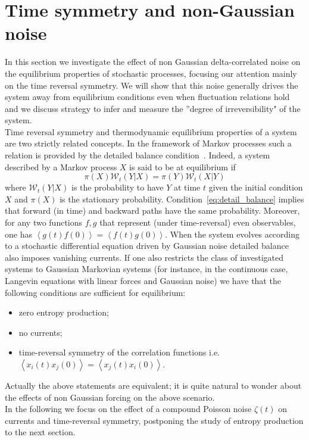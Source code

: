 \documentclass[12pt]{iopart}
\newcommand{\lx} {\left}
\newcommand{\rx} {\right}
\newcommand{\ave}[1] {\lx\langle #1 \rx\rangle}
\newcommand{\cW} {\mathcal{W}}
\begin{document}
\section{Time symmetry and non-Gaussian noise}
\label{sec:ts}
In this section we investigate the effect of non Gaussian delta-correlated noise on the equilibrium properties of stochastic processes, focusing our attention mainly on the time reversal symmetry. We will show that this noise generally drives the system away from equilibrium conditions even when fluctuation relations hold and we discuss strategy to infer and measure the  ”degree of irreversibility" of the system.\\
Time reversal symmetry and thermodynamic equilibrium properties of a system are two strictly related concepts. 
In the framework of Markov processes such a relation is provided by the detailed balance condition~\cite{G90}. Indeed, a system described by a Markov process $X$ is said to be at equilibrium if 
\begin{equation}
    \pi(X)\cW_t(Y|X)=\pi(Y){\cW}_t(X|Y)
\label{eq:detail_balance}
\end{equation}
where $\cW_t(Y|X)$ is the probability to have $Y$ at time $t$ given the initial condition $X$ and $\pi(X)$ is the stationary probability. Condition~\ref{eq:detail_balance} implies that forward (in time) and backward paths have the same probability. Moreover, for any two functions $f,g$ that represent  (under time-reversal) even observables, one has $\ave{g(t)f (0) }=\ave{f(t) g (0) }$. When the system evolves according to a stochastic differential equation driven by Gaussian noise detailed balance also imposes vanishing currents. If one also restricts the class of investigated systems to Gaussian Markovian systems (for instance, in the continuous case, Langevin equations with linear forces and Gaussian noise) we have that the following conditions are sufficient for equilibrium:
\begin{itemize}
  \item  zero entropy production;
  \item no currents;
  \item time-reversal symmetry  of the correlation functions  i.e. $\ave{x_i(t)x_j(0)}=\ave{x_j(t)x_i(0)}$.
\end{itemize}
Actually  the above statements  are  equivalent;
it is quite natural to wonder about the effects of  non Gaussian forcing on the above scenario. \\
In the following we focus on the effect of a compound Poisson noise  $\zeta(t)$ on currents and time-reversal symmetry, postponing  the study of entropy production to the next section.
\end{document}
